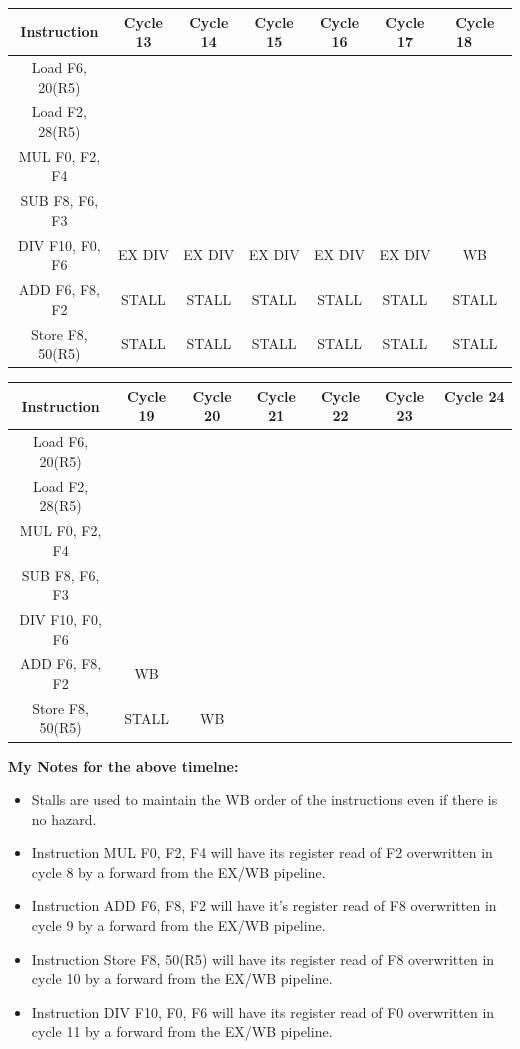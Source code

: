 \documentclass[a4paper, 11pt]{exam}
\begin{document}
\begin{center}
\begin{enumerate}
\begin{enumerate}
\begin{center}
\begin{tabular}{ |c|c|c|c|c|c|c| } 
 \hline
  \textbf{Instruction} & \textbf{Cycle 13} & \textbf{Cycle 14} & \textbf{Cycle 15} & \textbf{Cycle 16} & \textbf{Cycle 17} & 
  \textbf{Cycle 18 \ \ } \\ 
  \hline
 Load F6, 20(R5) &  &  &  &  &  & \\ \hline
 Load F2, 28(R5) &  &  &  &  &  & \\ \hline
 MUL F0, F2, F4 &  &  &  &  &  & \\ \hline
 SUB F8, F6, F3 &  &  &  &  & & \\ \hline
 DIV F10, F0, F6 & EX DIV & EX DIV & EX DIV & EX DIV & EX DIV & WB\\ \hline
 ADD F6, F8, F2 & STALL & STALL & STALL & STALL & STALL & STALL\\ \hline
 Store F8, 50(R5) & STALL & STALL & STALL & STALL & STALL & STALL\\ \hline
\end{tabular}

\begin{tabular}{ |c|c|c|c|c|c|c| } 
 \hline
  \textbf{Instruction} & \textbf{Cycle 19} & \textbf{Cycle 20} & \textbf{Cycle 21} & \textbf{Cycle 22} & \textbf{Cycle 23} & 
  \textbf{Cycle 24 \ \ } \\ 
  \hline
 Load F6, 20(R5) &  &  &  &  &  & \\ \hline
 Load F2, 28(R5) &  &  &  &  &  & \\ \hline
 MUL F0, F2, F4 &  &  &  &  &  & \\ \hline
 SUB F8, F6, F3 &  &  &  &  &  & \\ \hline
 DIV F10, F0, F6 &  &  &  &  &  & \\ \hline
 ADD F6, F8, F2 & WB &  &  &  &  & \\ \hline
 Store F8, 50(R5) & STALL & WB &  &  &  & \\ \hline
\end{tabular}
\end{center}


\end{enumerate}
\textbf{My Notes for the above timelne:}
%
\begin{itemize}
	\item Stalls are used to maintain the WB order of the instructions even if there is no hazard.
	\item Instruction MUL F0, F2, F4 will have its register read of F2 overwritten in cycle 8 by a forward from the EX/WB pipeline. 
	\item Instruction ADD F6, F8, F2 will have it's register read of F8 overwritten in cycle 9 by a forward from the EX/WB pipeline.
	\item Instruction Store F8, 50(R5) will have its register read of F8 overwritten in cycle 10 by a forward from the EX/WB pipeline.
	\item Instruction DIV F10, F0, F6 will have its register read of F0 overwritten in cycle 11 by a forward from the EX/WB pipeline.
\end{itemize}


\end{enumerate}
\end{center}
\end{document}
